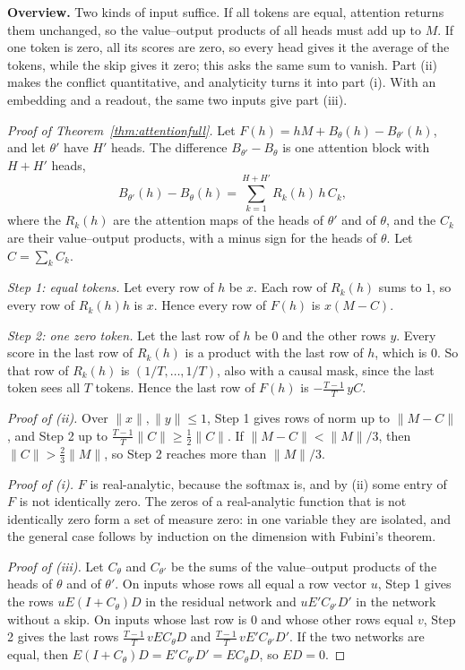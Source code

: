 \documentclass[10pt]{article}
\theoremstyle{definition}
\theoremstyle{remark}
\newcommand{\norm}[1]{\lVert #1\rVert}
\newcommand{\para}[1]{\smallskip\noindent\textbf{#1}\hspace{0.5em}}
\begin{document}
\para{Overview.} Two kinds of input suffice. If all tokens are equal, attention returns them unchanged, so the value--output products of all heads must add up to $M$. If one token is zero, all its scores are zero, so every head gives it the average of the tokens, while the skip gives it zero; this asks the same sum to vanish. Part (ii) makes the conflict quantitative, and analyticity turns it into part (i). With an embedding and a readout, the same two inputs give part (iii).

\begin{proof}[Proof of Theorem~\ref{thm:attentionfull}]
Let $F(h) = hM + B_\theta(h) - B_{\theta'}(h)$, and let $\theta'$ have $H'$ heads. The difference $B_{\theta'} - B_\theta$ is one attention block with $H + H'$ heads,
\[
B_{\theta'}(h) - B_\theta(h) = \sum_{k=1}^{H+H'} R_k(h)\, h\, C_k,
\]
where the $R_k(h)$ are the attention maps of the heads of $\theta'$ and of $\theta$, and the $C_k$ are their value--output products, with a minus sign for the heads of $\theta$. Let $C = \sum_k C_k$.

\emph{Step 1: equal tokens.} Let every row of $h$ be $x$. Each row of $R_k(h)$ sums to $1$, so every row of $R_k(h)h$ is $x$. Hence every row of $F(h)$ is $x(M - C)$.

\emph{Step 2: one zero token.} Let the last row of $h$ be $0$ and the other rows $y$. Every score in the last row of $R_k(h)$ is a product with the last row of $h$, which is $0$. So that row of $R_k(h)$ is $(1/T, \dots, 1/T)$, also with a causal mask, since the last token sees all $T$ tokens. Hence the last row of $F(h)$ is $-\frac{T-1}{T}\,yC$.

\emph{Proof of (ii).} Over $\norm{x}, \norm{y} \le 1$, Step 1 gives rows of norm up to $\norm{M - C}$, and Step 2 up to $\frac{T-1}{T}\norm{C} \ge \frac12\norm{C}$. If $\norm{M - C} < \norm{M}/3$, then $\norm{C} > \frac23\norm{M}$, so Step 2 reaches more than $\norm{M}/3$.

\emph{Proof of (i).} $F$ is real-analytic, because the softmax is, and by (ii) some entry of $F$ is not identically zero. The zeros of a real-analytic function that is not identically zero form a set of measure zero: in one variable they are isolated, and the general case follows by induction on the dimension with Fubini's theorem.

\emph{Proof of (iii).} Let $C_\theta$ and $C_{\theta'}$ be the sums of the value--output products of the heads of $\theta$ and of $\theta'$. On inputs whose rows all equal a row vector $u$, Step 1 gives the rows $uE(I + C_\theta)D$ in the residual network and $uE'C_{\theta'}D'$ in the network without a skip. On inputs whose last row is $0$ and whose other rows equal $v$, Step 2 gives the last rows $\frac{T-1}{T}\,vEC_\theta D$ and $\frac{T-1}{T}\,vE'C_{\theta'}D'$. If the two networks are equal, then $E(I + C_\theta)D = E'C_{\theta'}D' = EC_\theta D$, so $ED = 0$.
\end{proof}
\end{document}

